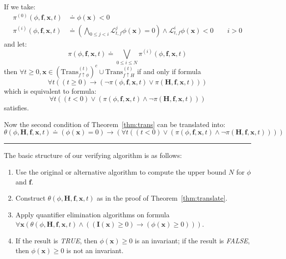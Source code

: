 \documentclass{jssc}
\newcommand{\rulex}{\hfill\rule{1mm}{3mm}}
\begin{document}
If we take:
	\begin{align*}
		\pi^{(0)}(\phi, \boldsymbol{f}, \boldsymbol{x}, t) &\doteq \phi(\boldsymbol{x}) < 0 \\
		\pi^{(i)}(\phi, \boldsymbol{f}, \boldsymbol{x}, t) &\doteq (\bigwedge_{0 \leq j < i} \mathcal{L}_{t, f}^j \phi(\boldsymbol{x}) = 0) \wedge \mathcal{L}_{t, f}^i \phi(\boldsymbol{x}) < 0 \qquad i > 0
	\end{align*}
and let:
	\begin{equation*}
		\pi(\phi, \boldsymbol{f}, \boldsymbol{x}, t) \doteq \bigvee_{0 \leq i \leq N} \pi^{(i)}(\phi, \boldsymbol{f}, \boldsymbol{x}, t)
	\end{equation*}
then $\forall t \geq 0, \boldsymbol{x} \in (\mathrm{Trans}_{f \uparrow \phi}^{(t)})^c \cup \mathrm{Trans}_{f \uparrow H}^{(t)}$ if and only if formula
	\begin{equation*}
		\forall t ((t \geq 0) \rightarrow (\neg \pi(\phi, \boldsymbol{f}, \boldsymbol{x}, t) \vee \pi(\boldsymbol{H}, \boldsymbol{f}, \boldsymbol{x}, t)))
	\end{equation*}
which is equivalent to formula:
	\begin{equation*}
		\forall t ((t < 0) \vee (\pi(\phi, \boldsymbol{f}, \boldsymbol{x}, t) \wedge \neg \pi(\boldsymbol{H}, \boldsymbol{f}, \boldsymbol{x}, t)))
	\end{equation*}
satisfies.

Now the second condition of Theorem~\ref{thm:trans} can be translated into:
	\begin{equation*}
		\theta(\phi ,\boldsymbol{H}, \boldsymbol{f}, \boldsymbol{x}, t) \doteq (\phi(\boldsymbol{x}) = 0) \rightarrow (\forall t ((t < 0) \vee (\pi(\phi, \boldsymbol{f}, \boldsymbol{x}, t) \wedge \neg \pi(\boldsymbol{H}, \boldsymbol{f}, \boldsymbol{x}, t))))
	\end{equation*}
\rulex \newline

The basic structure of our verifying algorithm is as follows:
\begin{enumerate}
	\item Use the original or alternative algorithm to compute the upper bound $N$ for $\phi$ and $\boldsymbol{f}$.
	\item Construct $\theta(\phi ,\boldsymbol{H}, \boldsymbol{f}, \boldsymbol{x}, t)$ as in the proof of Theorem~\ref{thm:translate}.
	\item Apply quantifier elimination algorithms on formula $\forall \boldsymbol{x} (\theta(\phi, \boldsymbol{H}, \boldsymbol{f}, \boldsymbol{x}, t) \wedge ((\boldsymbol{I}(\boldsymbol{x}) \geq 0) \rightarrow (\phi(\boldsymbol{x}) \geq 0)))$.
	\item If the result is \emph{TRUE}, then $\phi(\boldsymbol{x}) \geq 0$ is an invariant; if the result is \emph{FALSE}, then $\phi(\boldsymbol{x}) \geq 0$ is not an invariant.
\end{enumerate}
\end{document}
